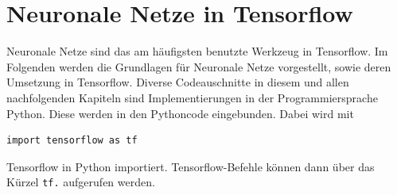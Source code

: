 \chapter{Neuronale Netze in Tensorflow}
Neuronale Netze sind das am h\"aufigsten benutzte Werkzeug in Tensorflow. Im Folgenden werden die Grundlagen f\"ur Neuronale Netze vorgestellt, sowie deren Umsetzung in Tensorflow. Diverse Codeauschnitte in diesem und allen nachfolgenden Kapiteln sind Implementierungen in der Programmiersprache Python. Diese werden in den Pythoncode eingebunden. Dabei wird mit \cite{cookbook}
\begin{lstlisting}
import tensorflow as tf
\end{lstlisting} Tensorflow in Python importiert. Tensorflow-Befehle können dann über das Kürzel \lstinline$tf.$ aufgerufen werden.

